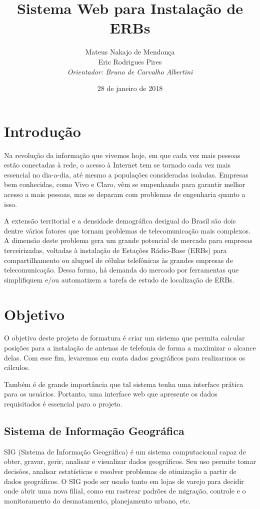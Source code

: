 \documentclass[12pt,a4paper]{article}
\title{Sistema Web para Instalação de ERBs}
\author{Mateus Nakajo de Mendonça  \\
	Eric Rodrigues Pires  \\
	\em{Orientador: Bruno de Carvalho Albertini}
	}
\date{28 de janeiro de 2018}
\begin{document}
\maketitle

\begin{abstract}

\lipsum[1]

\end{abstract}

\section{Introdução}
Na revolução da informação que vivemos hoje, em que cada vez mais pessoas estão
conectadas à rede, o acesso à Internet tem se tornado cada vez mais essencial
no dia-a-dia, até mesmo a populações consideradas isoladas. Empresas bem
conhecidas, como Vivo e Claro, vêm se empenhando para garantir melhor acesso a
mais pessoas, mas se deparam com problemas de engenharia quanto a isso.

A extensão territorial e a densidade demográfica desigual do Brasil são dois
dentre vários fatores que tornam problemas de telecomunicação mais complexos.
A dimensão deste problema gera um grande potencial de mercado para empresas
terceirizadas, voltadas à instalação de Estações Rádio-Base (ERBs) para
compartilhamento ou aluguel de células telefônicas às grandes empresas de
telecomunicação. Dessa forma, há demanda do mercado por ferramentas que
simplifiquem e/ou automatizem a tarefa de estudo de localização de ERBs.

\section{Objetivo}
O objetivo deste projeto de formatura é criar um sistema que permita calcular
posições para a instalação de antenas de telefonia de forma a maximizar o
alcance delas. Com esse fim, levaremos em conta dados geográficos para
realizarmos os cálculos.

Também é de grande importância que tal sistema tenha uma interface prática
para os usuários. Portanto, uma interface web que apresente os dados
requisitados é essencial para o projeto.

\subsection{Sistema de Informação Geográfica}
SIG (Sistema de Informação Geográfica) é um sistema computacional capaz de
obter, gravar, gerir, analisar e visualizar dados geográficos. Seu uso permite
tomar decisões, analisar estatísticas e resolver problemas de otimização a
partir de dados geográficos. O SIG pode ser usado tanto em lojas de varejo para
decidir onde abrir uma nova filial, como em rastrear padrões de migração,
controle e o monitoramento do desmatamento, planejamento urbano, etc.
\end{document}
